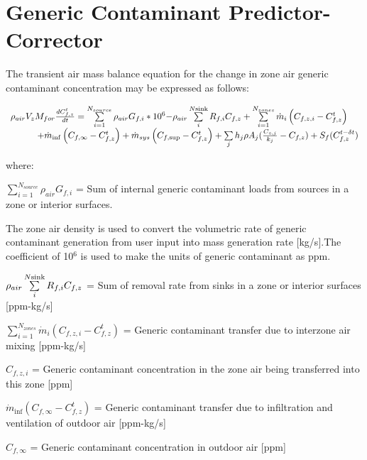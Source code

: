 \section{Generic Contaminant Predictor-Corrector}\label{generic-contaminant-predictor-corrector}

The transient air mass balance equation for the change in zone air generic contaminant concentration may be expressed as follows:

\begin{equation}
\begin{array}{l}{\rho_{air}}{V_z}{M_{for}}\frac{{dC_{f,z}^t}}{{dt}} = \sum\limits_{i = 1}^{{N_{source}}} {{\rho_{air}}{G_{f,i}}*{{10}^6} - } {\rho_{air}}\sum\limits_i^{N{\rm{sink}}} {{R_{f,i}}{C_{f,z}}}  + \sum\limits_{i = 1}^{{N_{zones}}} {{{\dot m}_i}} \left( {{C_{f,z,i}} - C_{f,z}^t} \right) \\
\quad \quad \quad + {{\dot m}_{\inf }}\left( {{C_{f,\infty }} - C_{f,z}^t} \right) + {{\dot m}_{sys}}\left( {{C_{f,\sup }} - C_{f,z}^t} \right) + \sum\limits_j {{h_j}\rho {A_j}(\frac{{{C_{s,j}}}}{{{k_j}}} - {C_{f,z}})}  + {S_f}(C_{f,z}^{t - \delta t})\end{array}
\end{equation}

where:

\(\sum\limits_{i = 1}^{{N_{source}}} {{\rho_{air}}{G_{f,i}}}\) = Sum of internal generic contaminant loads from sources in a zone or interior surfaces.

The zone air density is used to convert the volumetric rate of generic contaminant generation from user input into mass generation rate {[}kg/s{]}.The coefficient of 10\(^{6}\) is used to make the units of generic contaminant as ppm.

\({\rho_{air}}\sum\limits_i^{N{\rm{sink}}} {{R_{f,i}}{C_{f,z}}}\) = Sum of removal rate from sinks in a zone or interior surfaces {[}ppm-kg/s{]}

\(\sum_{i = 1}^{N_{zones}} \dot m_i \left( C_{f,z,i} - C_{f,z}^t \right)\) = Generic contaminant transfer due to interzone air mixing {[}ppm-kg/s{]}

\({C_{f,z,i}}\) = Generic contaminant concentration in the zone air being transferred into this zone {[}ppm{]}

\({\dot m_{\inf }}\left( {{C_{f,\infty }} - C_{f,z}^t} \right)\) = Generic contaminant transfer due to infiltration and ventilation of outdoor air {[}ppm-kg/s{]}

\({C_{f,\infty }}\) = Generic contaminant concentration in outdoor air {[}ppm{]}


